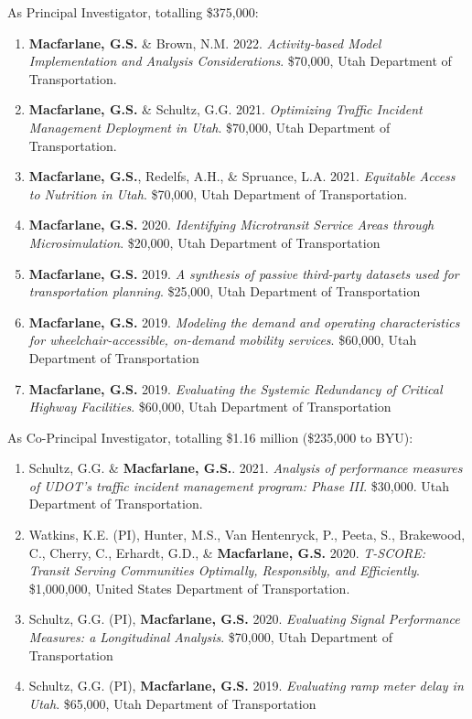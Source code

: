 \documentclass[margin,line]{res}
\newcounter{enuminitialize}
\newenvironment{myenum}[1][]
{%
 \setcounter{enuminitialize}{#1}
 \addtocounter{enuminitialize}{2}
 \begin{enumerate}[left= 4pt, itemsep=12pt, start=\value{enuminitialize}, label=\arabic*\addtocounter{enumi}{-2}]
}
{%
 \end{enumerate}
}
\begin{document}
\begin{resume}
As Principal Investigator, totalling \$375,000:
\vspace{0.3cm}
\begin{myenum}[7]
  \item {\textbf{Macfarlane, G.S.} \& Brown, N.M. 2022. \textit{Activity-based Model Implementation and Analysis Considerations}. \$70,000, Utah Department of Transportation.}
  \item {\textbf{Macfarlane, G.S.} \& Schultz, G.G. 2021. \textit{Optimizing Traffic Incident Management Deployment in Utah}. \$70,000, Utah Department of Transportation.}
  \item {\textbf{Macfarlane, G.S.}, Redelfs, A.H., \& Spruance, L.A. 2021. \textit{Equitable Access to Nutrition in Utah}. \$70,000, Utah Department of Transportation.}
  \item {\textbf{Macfarlane, G.S.} 2020. \textit{ Identifying Microtransit Service Areas
through Microsimulation}. \$20,000, Utah Department of Transportation}
  \item {\textbf{Macfarlane, G.S.} 2019. \textit{ A synthesis of passive third-party datasets
used for transportation planning}. \$25,000, Utah Department of Transportation}
  \item {\textbf{Macfarlane, G.S.} 2019. \textit{ Modeling the demand and operating
characteristics for wheelchair-accessible, on-demand mobility services}.
\$60,000, Utah Department of Transportation}
  \item {\textbf{Macfarlane, G.S.} 2019. \textit{ Evaluating the Systemic Redundancy of
Critical Highway Facilities}. \$60,000, Utah Department of Transportation}
\end{myenum}

As Co-Principal Investigator, totalling \$1.16 million (\$235,000 to BYU):
\vspace{0.3cm}
\begin{myenum}[4]
  \item{Schultz, G.G. \& \textbf{Macfarlane, G.S.}. 2021. \textit{Analysis of
  performance measures of UDOT’s traffic incident management program: Phase
  III}. \$30,000. Utah Department of Transportation.}
  \item{Watkins, K.E. (PI), Hunter, M.S., Van Hentenryck, P., Peeta, S.,
  Brakewood, C., Cherry, C., Erhardt, G.D., \& \textbf{Macfarlane, G.S.} 2020. \textit{
  T-SCORE: Transit Serving Communities Optimally, Responsibly, and Efficiently}.
  \$1,000,000, United States Department of Transportation.}
  \item{ Schultz, G.G. (PI), \textbf{Macfarlane, G.S.} 2020. \textit{ Evaluating Signal
  Performance Measures: a Longitudinal Analysis}. \$70,000, Utah Department of
  Transportation}
  \item{ Schultz, G.G. (PI), \textbf{Macfarlane, G.S.} 2019. \textit{ Evaluating ramp meter
delay in Utah}. \$65,000, Utah Department of Transportation}
\end{myenum}


\end{resume}
\end{document}

